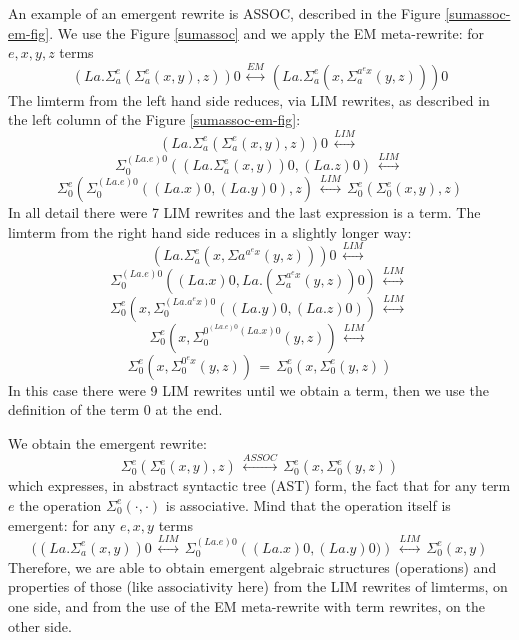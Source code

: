 An example of an emergent rewrite is ASSOC, described in the Figure \ref{sumassoc-em-fig}. We use the Figure \ref{sumassoc} and we apply the EM meta-rewrite: for $e, x, y, z$ terms 
$$ \displaystyle \left(La.\Sigma_{a}^{e}\left( \Sigma_{a}^{e}\left(x,y\right), z\right)\right) 0 \, \stackrel{EM}{\longleftrightarrow} \, \left(La.\Sigma_{a}^{e}\left( x, \Sigma_{a}^{a^{e} x} \left( y,z\right)\right)\right) 0 $$
The limterm from the left hand side reduces, via LIM rewrites, as described in the left column of the Figure \ref{sumassoc-em-fig}: 
$$ \displaystyle \left(La.\Sigma_{a}^{e}\left( \Sigma_{a}^{e}\left(x,y\right), z\right)\right) 0 \, \stackrel{LIM}{\longleftrightarrow} \, $$ 
$$ \Sigma_{0}^{(La.e)0}\left( \left( La.\Sigma_{a}^{e}\left(x,y\right)\right) 0, (La.z)0\right) \, \stackrel{LIM}{\longleftrightarrow} \, $$ 
$$\Sigma_{0}^{e}\left( \Sigma_{0}^{(La.e) 0}\left((La.x)0,(La.y)0\right), z\right) \, \stackrel{LIM}{\longleftrightarrow} \, \Sigma_{0}^{e}\left( \Sigma_{0}^{e}\left(x,y\right), z\right)$$
In all detail there were 7 LIM rewrites and the last expression is a term. The limterm from the right hand side reduces in a slightly longer way: 
$$ \displaystyle  \left(La.\Sigma_{a}^{e}\left( x, \Sigma{a}^{a^{e} x} \left( y,z\right)\right)\right) 0 \, \stackrel{LIM}{\longleftrightarrow} \, $$ 
$$\Sigma_{0}^{(La.e) 0}\left( (La.x)0, La.\left(\Sigma_{a}^{a^{e} x} \left( y,z\right)\right) 0\right) \, \stackrel{LIM}{\longleftrightarrow} \, $$ 
$$ \Sigma_{0}^{e}\left( x , \Sigma_{0}^{\left(La.a^{e} x\right) 0} \left( (La.y) 0, (La.z) 0\right)\right) \, \stackrel{LIM}{\longleftrightarrow} \, $$
$$ \Sigma_{0}^{e}\left( x , \Sigma_{0}^{0^{(La.e) 0} (La.x) 0} \left( y, z\right)\right) \, \stackrel{LIM}{\longleftrightarrow} \, $$
$$ \Sigma_{0}^{e}\left( x , \Sigma_{0}^{0^{e} x} \left( y, z\right)\right) \, = \, \Sigma_{0}^{e}\left( x , \Sigma_{0}^{e} \left( y, z\right)\right)   $$
In this case there were 9 LIM rewrites until we obtain a term, then we use the definition of the term $0$ at the end.

We obtain the emergent rewrite: 
$$\Sigma_{0}^{e}\left( \Sigma_{0}^{e}\left(x,y\right), z\right) \, \stackrel{ASSOC}{\longleftrightarrow} \, \Sigma_{0}^{e}\left( x , \Sigma_{0}^{e} \left( y, z\right)\right)   $$
which expresses, in abstract syntactic tree (AST) form, the fact that for any term $e$ the operation $\displaystyle \Sigma_{0}^{e}(\cdot, \cdot)$ is associative. Mind that the operation itself is emergent: for any $e, x, y$ terms 
$$(\left(La. \Sigma_{a}^{e}(x,y)\right) 0  \, \stackrel{LIM}{\longleftrightarrow} \, \Sigma_{0}^{(La.e) 0} \left((La.x) 0 , (La.y) 0) \right)  \, \stackrel{LIM}{\longleftrightarrow} \, \Sigma_{0}^{e}(x,y)$$
Therefore, we are able to obtain emergent algebraic structures (operations) and properties of those (like associativity here) from the LIM rewrites of limterms, on one side, and from the use of the EM meta-rewrite with term rewrites, on the other side. 


